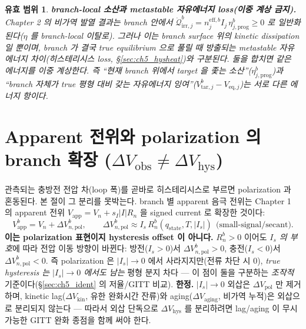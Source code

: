 \documentclass[11pt,a4paper]{article}
\newtheorem*{boundbox}{유효 범위}
\newcommand{\eff}{\mathrm{eff}}
\newcommand{\eq}{\mathrm{eq}}
\newcommand{\app}{\mathrm{app}}
\newcommand{\irr}{\mathrm{irr}}
\newcommand{\hys}{\mathrm{hys}}
\newcommand{\pol}{\mathrm{pol}}
\newcommand{\kin}{\mathrm{kin}}
\newcommand{\obs}{\mathrm{obs}}
\newcommand{\tar}{\mathrm{tar}}
\newcommand{\stt}{\mathrm{state}}
\newcommand{\prog}{\mathrm{prog}}
\begin{document}
\begin{boundbox}
\textbf{branch-local 소산과 metastable 자유에너지 loss(이중 계상 금지).} Chapter 2 의 비가역 발열 결과는 branch
안에서 $\dot{\mathcal Q}_{\irr,j}^b=n_j^{\eff,b}I_j\,\eta_{j,\prog}^b\ge0$ 로 일반화된다($\eta$ 를 branch-local
이탈로). 그러나 이는 branch surface 위의 kinetic dissipation 일 뿐이며, branch 가 결국 true equilibrium 으로 풀릴
때 방출되는 metastable 자유에너지 차이(히스테리시스 loss, \S\ref{sec:ch5_hysheat})와 \emph{구분}된다. 둘을 합치면
같은 에너지를 이중 계상한다. 즉 ``현재 branch 위에서 target 을 좇는 소산''($\eta_{j,\prog}^b$)과 ``branch 자체가
true 평형 대비 갖는 자유에너지 잉여''($V_{\tar,j}^b-V_{\eq,j}$)는 서로 다른 에너지 항이다.
\end{boundbox}

\section{Apparent 전위와 polarization 의 branch 확장 ($\Delta V_\obs\ne\Delta V_\hys$)}\label{sec:ch5_apparent}
관측되는 충방전 전압 차(loop 폭)를 곧바로 히스테리시스로 부르면 polarization 과 혼동된다. 본 절이 그 분리를
못박는다. branch 별 apparent 음극 전위는 Chapter 1 의 apparent 전위 $V_\app=V_n+s_I|I|R_n$ 을 signed current 로
확장한 것이다:
\begin{equation}
V_\app^b=V_n+\Delta V_{n,\pol}^b,\qquad
\Delta V_{n,\pol}^b\approx I_s\,R_n^b(q_\stt,T,|I_s|)\ \ \text{(small-signal/secant)}.
\label{eq:ch5_vapp_branch}
\end{equation}
\textbf{이는 polarization 표현이지 hysteresis offset 이 아니다.} $R_n^b>0$ 이어도 \emph{$I_s$ 의 부호}에 따라
전압 이동 방향이 바뀐다: 방전($I_s>0$)서 $\Delta V_{n,\pol}^b>0$, 충전($I_s<0$)서 $\Delta V_{n,\pol}^b<0$. 즉
polarization 은 $|I_s|\to0$ 에서 사라지지만(전류 차단 시 0), \emph{true hysteresis 는 $|I_s|\to0$ 에서도 남는}
평형 분지 차다 — 이 점이 둘을 구분하는 \emph{조작적} 기준이다(\S\ref{sec:ch5_ident} 의 저율/GITT 비교).
\textbf{한정.} $|I_s|\to0$ 외삽은 $\Delta V_\pol$ 만 제거하며, kinetic lag($\Delta V_\kin$, 유한 완화시간
잔류)와 aging($\Delta V_{\mathrm{aging}}$, 비가역 누적)은 외삽으로 분리되지 않는다 — 따라서 외삽 단독으로
$\Delta V_\hys$ 를 분리하려면 lag/aging 이 무시 가능한 GITT 완화 종점을 함께 써야 한다.
\end{document}
